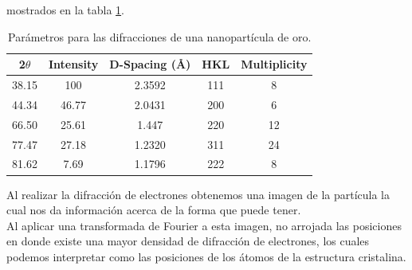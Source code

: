 \documentclass[reprint,amsmath,amssymb,aps,]{revtex4-2}
\begin{document}
mostrados en la tabla \ref{tabla:parametros}.
\begin{table}[H]
    \centering
    \begin{tabular}{ccccc}\hline
        2$\theta$ & Intensity & D-Spacing (\r{A}) & HKL & Multiplicity\\ \hline
        38.15 & 100 & 2.3592 & 111 & 8 \\
        44.34 & 46.77 & 2.0431 & 200 & 6 \\
        66.50 & 25.61 & 1.447 & 220 & 12 \\
        77.47 & 27.18 & 1.2320 & 311 & 24 \\
        81.62 & 7.69 & 1.1796 & 222 & 8 \\ \hline
    \end{tabular}
    \caption{Parámetros para las difracciones de una nanopartícula de oro.}
    \label{tabla:parametros}
\end{table}
Al realizar la difracción de electrones obtenemos una imagen de la partícula la cual nos da información acerca de la forma que puede tener. \\
Al aplicar una transformada de Fourier a esta imagen, no arrojada las posiciones en donde existe una mayor densidad de difracción de electrones, los cuales podemos interpretar como las posiciones de los átomos
de la estructura cristalina.
\vspace{-2cm}
\end{document}
